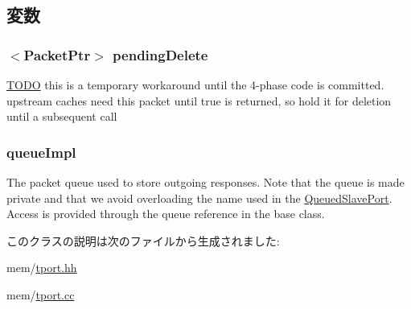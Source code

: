 \subsection{変数}
\hypertarget{classSimpleTimingPort_a21da4bea3554874b557428e4cce5d4a4}{
\subsubsection[{pendingDelete}]{$<${\bf PacketPtr}$>$ {\bf pendingDelete}}}
\label{classSimpleTimingPort_a21da4bea3554874b557428e4cce5d4a4}
\begin{Desc}
\item[\hyperlink{todo__todo000090}{TODO}]this is a temporary workaround until the 4-\/phase code is committed. upstream caches need this packet until true is returned, so hold it for deletion until a subsequent call \end{Desc}
\hypertarget{classSimpleTimingPort_ab41143071108edb2c003308b57c50d8e}{
\subsubsection[{queueImpl}]{ {\bf queueImpl}}}
\label{classSimpleTimingPort_ab41143071108edb2c003308b57c50d8e}
The packet queue used to store outgoing responses. Note that the queue is made private and that we avoid overloading the name used in the \hyperlink{classQueuedSlavePort}{QueuedSlavePort}. Access is provided through the queue reference in the base class. 

このクラスの説明は次のファイルから生成されました:\begin{DoxyCompactItemize}
\item 
mem/\hyperlink{tport_8hh}{tport.hh}\item 
mem/\hyperlink{tport_8cc}{tport.cc}\end{DoxyCompactItemize}
